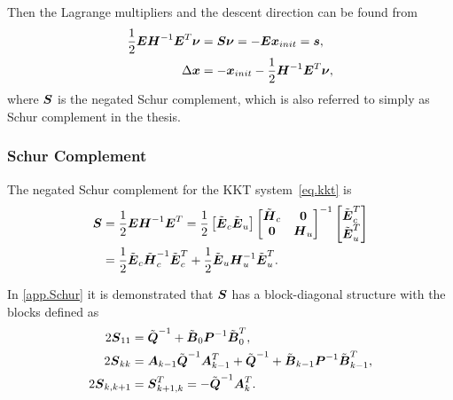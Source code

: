 Then the Lagrange multipliers and the descent direction can be found from
\begin{align*}
\frac{1}{2} \mbox{\boldmath $E$} \mbox{\boldmath $H$}^{-1} \mbox{\boldmath $E$}^T \mbox{\boldmath $\nu$} &= 
    \mbox{\boldmath $S$} \mbox{\boldmath $\nu$} = - \mbox{\boldmath $E$} \mbox{\boldmath $x$}_{init} = \mbox{\boldmath $s$},\\
\Delta\mbox{\boldmath $x$} &= - \mbox{\boldmath $x$}_{init} - \frac{1}{2} \mbox{\boldmath $H$}^{-1} \mbox{\boldmath $E$}^T \mbox{\boldmath $\nu$},
\end{align*}
where $\mbox{\boldmath $S$}$ is the negated Schur complement, which is also referred to simply as
Schur complement in the thesis.


\subsubsection{Schur Complement}\label{sec.schur}
The negated Schur complement for the \ac{KKT} system~\eqref{eq.kkt} is 
\begin{align*}
\mbox{\boldmath $S$} 
&= \frac{1}{2}\mbox{\boldmath $E$}\mbox{\boldmath $H$}^{-1}\mbox{\boldmath $E$}^T 
= \frac{1}{2}
    \begin{bmatrix}\tilde{\mbox{\boldmath $E$}}_c  \tilde{\mbox{\boldmath $E$}}_u\end{bmatrix}
    \begin{bmatrix}
            \tilde{\mbox{\boldmath $H$}}_c & \mbox{\boldmath $0$} \\ 
            \mbox{\boldmath $0$} & \mbox{\boldmath $H$}_u
    \end{bmatrix}^{-1}
    \begin{bmatrix}
            \tilde{\mbox{\boldmath $E$}}_c^T \\ 
            \tilde{\mbox{\boldmath $E$}}_u^T 
    \end{bmatrix} \\
&= \frac{1}{2}\tilde{\mbox{\boldmath $E$}}_c\tilde{\mbox{\boldmath $H$}}_c^{-1}\tilde{\mbox{\boldmath $E$}}_c^T 
+ \frac{1}{2}\tilde{\mbox{\boldmath $E$}}_u\mbox{\boldmath $H$}_u^{-1}\tilde{\mbox{\boldmath $E$}}_u^T.
\end{align*}

In \cref{app.Schur} it is demonstrated that $\mbox{\boldmath $S$}$ has a block-diagonal
structure with the blocks defined as
\begin{equation}\label{eq.schur_blocks}
\begin{split}
  2\mbm{S}_{11} &= \tilde{\mbm{Q}}^{-1} + \tilde{\mbm{B}}_0\mbm{P}^{-1}\tilde{\mbm{B}}^T_0,\\
  2\mbm{S}_{kk} &= \mbm{A}_{k-1}\tilde{\mbm{Q}}^{-1}\mbm{A}^T_{k-1} + \tilde{\mbm{Q}}^{-1} + 
                    \tilde{\mbm{B}}_{k-1}\mbm{P}^{-1}\tilde{\mbm{B}}^T_{k-1},\\
  2\mbm{S}_{k,k+1} &= \mbm{S}_{k+1,k}^T = -\tilde{\mbm{Q}}^{-1}\mbm{A}^T_{k}.
\end{split}
\end{equation}


